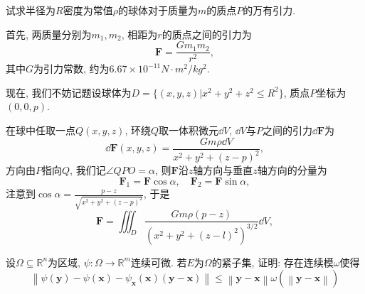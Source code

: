 \begin{quizb}
\woe 试求半径为\(R\)密度为常值\(\rho\)的球体对于质量为\(m\)的质点\(P\)的万有引力.
\begin{solution}
首先, 两质量分别为\(m_1,m_2\), 相距为\(r\)的质点之间的引力为\[\boldsymbol{F}=\frac{Gm_1m_2}{r^2},\]其中\(G\)为引力常数, 约为\(6.67\times 10^{-11}N\cdot m^2/kg^2\).

现在, 我们不妨记题设球体为\(D=\{(x,y,z)\big| x^2+y^2+z^2\leqslant R^2\}\), 质点\(P\)坐标为\((0,0,p)\).
\begin{figure}[H]
\end{figure}
在球中任取一点\(Q(x,y,z)\), 环绕\(Q\)取一体积微元\(\dd V\), \(\dd V\)与\(P\)之间的引力\(\dd\boldsymbol{F}\)为\[\dd \boldsymbol{F}(x,y,z)=\frac{Gm\rho\dd V}{x^2+y^2+(z-p)^2},\]方向由\(P\)指向\(Q\), 我们记\(\angle QPO=\alpha\), 则\(\boldsymbol{F}\)沿\(z\)轴方向与垂直\(z\)轴方向的分量为\[\boldsymbol{F}_1=\boldsymbol{F}\cos\alpha,\quad \boldsymbol{F}_2=\boldsymbol{F}\sin\alpha,\]注意到\(\cos\alpha=\frac{p-z}{\sqrt{x^2+y^2+(z-p)^2}}\), 于是\[\boldsymbol{F}=\iiint_{D}\frac{Gm\rho(p-z)}{(x^2+y^2+(z-l)^2)^{3/2}}\dd V,\]
\end{solution}
\woe 设\(\varOmega\subseteq\mathbb{R}^n\)为区域, \(\psi:\varOmega\rightarrow\mathbb{R}^m\)连续可微. 若\(E\)为\(\varOmega\)的紧子集, 证明: 存在连续模\(\omega\)使得\[\left\|\psi(\boldsymbol{y})-\psi(\boldsymbol{x})-\psi_{\boldsymbol{x}}(\boldsymbol{x})(\boldsymbol{y}-\boldsymbol{x})\right\|\leqslant\left\|\boldsymbol{y}-\boldsymbol{x}\right\|\omega\left(\left\|\boldsymbol{y}-\boldsymbol{x}\right\|\right)\]
\end{quizb}
